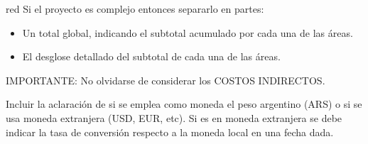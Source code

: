 \documentclass[
    11pt, %
]{charter}
\begin{document}
    \begin{consigna}{red}
        Si el proyecto es complejo entonces separarlo en partes:
        \begin{itemize}
            \item Un total global, indicando el subtotal acumulado por cada una de las áreas.
            \item El desglose detallado del subtotal de cada una de las áreas.
        \end{itemize}

        IMPORTANTE: No olvidarse de considerar los COSTOS INDIRECTOS.

        Incluir la aclaración de si se emplea como moneda el peso argentino (ARS) o si se usa moneda extranjera (USD, EUR, etc). Si es en moneda extranjera se debe indicar la tasa de conversión respecto a la moneda local en una fecha dada.

    \end{consigna}
\end{document}
